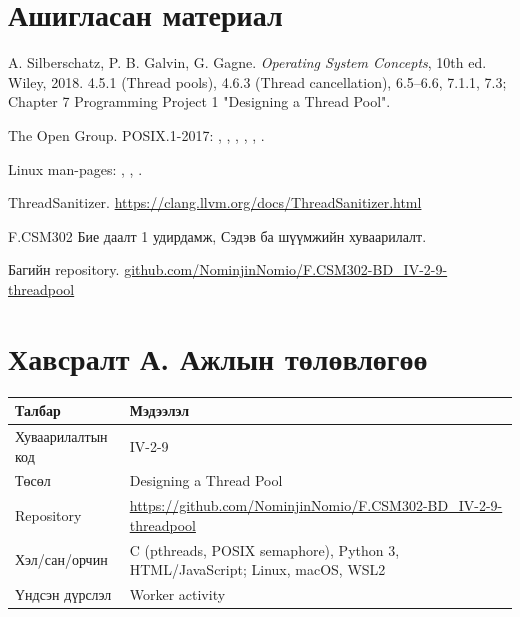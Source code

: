 \documentclass[12pt,a4paper]{article}
\begin{document}
\section*{Ашигласан материал}

\begin{enumerate}[label={[\arabic*]}, leftmargin=2.4em]
  \item A. Silberschatz, P. B. Galvin, G. Gagne. \textit{Operating System Concepts}, 10th ed. Wiley, 2018. 4.5.1 (Thread pools), 4.6.3 (Thread cancellation), 6.5–6.6, 7.1.1, 7.3; Chapter 7 Programming Project 1 "Designing a Thread Pool".
  \item The Open Group. POSIX.1-2017: , , , , , .
  \item Linux man-pages: , , .
  \item ThreadSanitizer. \url{https://clang.llvm.org/docs/ThreadSanitizer.html}
  \item F.CSM302 Бие даалт 1 удирдамж, Сэдэв ба шүүмжийн хуваарилалт.
  \item Багийн repository. \url{github.com/NominjinNomio/F.CSM302-BD_IV-2-9-threadpool}
\end{enumerate}

\clearpage
\section*{Хавсралт А. Ажлын төлөвлөгөө}

\begin{table}[H]
\centering
\begin{tabular}{|P{0.300}|P{0.700}|}
\hline
{} \textbf{Талбар} & \textbf{Мэдээлэл} \\ \hline
Хуваарилалтын код & IV-2-9 \\ \hline
Төсөл & Designing a Thread Pool \\ \hline
Repository & \url{https://github.com/NominjinNomio/F.CSM302-BD_IV-2-9-threadpool} \\ \hline
Хэл/сан/орчин & C (pthreads, POSIX semaphore), Python 3, HTML/JavaScript; Linux, macOS, WSL2 \\ \hline
Үндсэн дүрслэл & Worker activity \\ \hline
\end{tabular}
\end{table}
\end{document}
